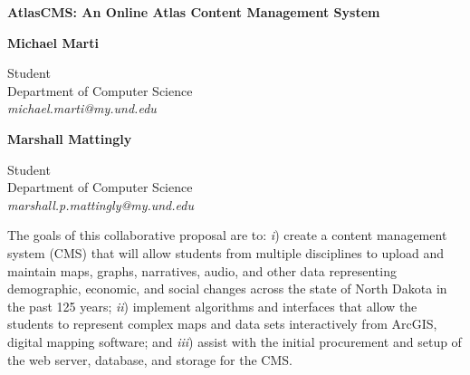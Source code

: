 \documentclass[12pt]{article}
\begin{document}
\pagestyle{empty}
\renewcommand{\thesection}{\Alph{section}}

\setlength{\parsep}{5pt}
\setlength{\parskip}{5pt plus 2pt minus 1pt}

\noindent
{\large\bf AtlasCMS: An Online Atlas Content Management System}

\begin{center}
\begin{minipage}{0.53\linewidth}
\begin{center}
{\bf Michael Marti}\\
\begin{small}
Student\\
Department of Computer Science\\
{\it michael.marti@my.und.edu}
\end{small}
\end{center}
\end{minipage}
\begin{minipage}{0.43\linewidth}
\begin{center}
{\bf Marshall Mattingly}\\
\begin{small}
Student\\
Department of Computer Science\\
{\it marshall.p.mattingly@my.und.edu}
\end{small}
\end{center}
\end{minipage}
\end{center}

\noindent
The goals of this collaborative proposal are to: {\it i}) create a content management system (CMS) that will allow students from multiple disciplines to upload and maintain maps, graphs, narratives, audio, and other data representing demographic, economic, and social changes across the state of North Dakota in the past 125 years; {\it ii}) implement algorithms and interfaces that allow the students to represent complex maps and data sets interactively from ArcGIS, digital mapping software; and {\it iii}) assist with the initial procurement and setup of the web server, database, and storage for the CMS.
\end{document}
